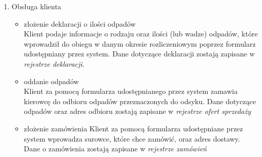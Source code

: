 
\begin{enumerate}
	\item Obsługa klienta
		\begin{itemize}
		\item złożenie deklaracji o ilości odpadów \\
		Klient podaje informacje o rodzaju oraz ilości (lub wadze) odpadów, które wprowadził do obiegu w danym okresie rozliczeniowym poprzez formularz udostępniany przez system. Dane dotyczące deklaracji zostają zapisane w \emph{rejestrze deklaracji}.
		\item oddanie odpadów \\
		Klient za pomocą formularza udostępnianego przez system zamawia kierowcę do odbioru odpadów przeznaczonych do odsyku.
		Dane dotyczące odpadów oraz adres odbioru zostają zapisane w \emph{rejestrze ofert sprzedaży}
		\item złożenie zamówienia
		Klient za pomocą formularza udostępniane przez system wprowadza surowce, które chce zamówić, oraz adres dostawy. Dane o zamówienia zostają zapisane w \emph{rejestrze zamówień}
		\end{itemize}


\end{enumerate}
